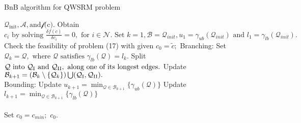 \documentclass{beamer}
\begin{document}
\begin{frame}[fragile]
  \footnotesize
    \begin{block}{BnB algorithm for QWSRM problem}
        \begin{algorithmic}
	  \Input $\mathcal{Q}_{\text{init}}, \mathcal{A}, \text{and} \mathcal{f} \text{(c)}.$
	  \Initialize Obtain $c_{i} \text{ by solving } \frac{\delta f(c)}{\delta c_{i}}=0, \text{ for } i\in\mathcal{N}.\text{ Set } k = 1, \mathcal{B} = \mathcal{Q}_{init},u_{1}=\gamma_{ub}(\mathcal{Q}_{init}) \text{ and } l_{1} = \gamma_{lb}(\mathcal{Q}_{init}).$\\
	  Check the feasibility of problem (17) with given
	  \State $c_{0} = \widetilde{c};$
	  \Else
	  \State Branching:
\State\quad{} Set $\mathcal{Q}_{k} = \mathcal{Q}, \text{ where } \mathcal{Q} \text{ satisfies } \gamma_{lb}(\mathcal{Q}) = l_{k}.$
	  \State\quad{} Split $\mathcal{Q} \text{ into } \mathcal{Q}_{\rm{I}} \text{ and } \mathcal{Q}_{\rm{II}}, \text{ along one of its longest edges.}$
	     \State\quad{} Update $\mathcal{B}_{k+1} = (\mathcal{B}_{k}\setminus{\{\mathcal{Q}_{k}\}}) \bigcup (\mathcal{Q}_{\rm{I}}, \mathcal{Q}_{\rm{II}}).$\\
	  \State Bounding:
	    \State\quad{} Update $u_{k+1} = \min_{\mathcal{Q}\in\mathcal{B}_{k+1}}{\{\gamma_{ub}(\mathcal{Q})}\}$
\State\quad{} Update $l_{k+1} = \min_{\mathcal{Q}\in\mathcal{B}_{k+1}}{\{\gamma_{lb}(\mathcal{Q})}\}$\\
	  \EndWhile\\
	  Set $c_{0} = c_{min};$
	  \EndIf
	  \Output $c_{0}.$
        \end{algorithmic}
    \end{block}
\end{frame}
\end{document}
